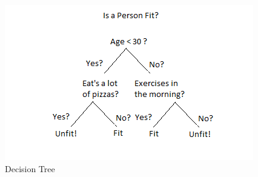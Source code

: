 \documentclass[a4paper,12pt]{report}
\begin{document}
\begin{figure}[htbp]
  \centering
  \includegraphics[width=\textwidth]{images/Decision-Trees.png}
  \caption{Decision Tree}
  \label{fig:fullwidth}
\end{figure}
	
\end{document}
